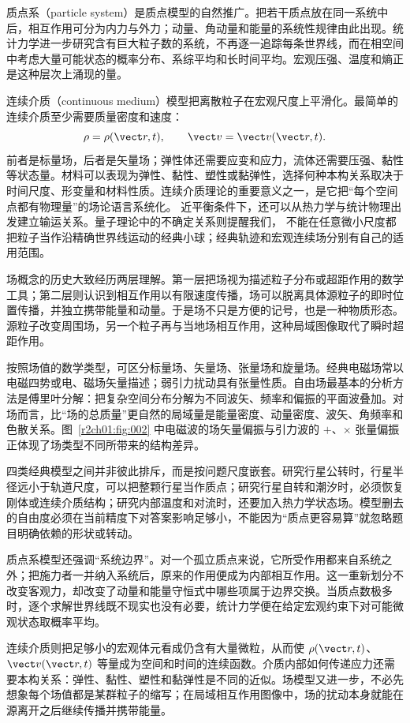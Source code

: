 质点系（particle system）是质点模型的自然推广。把若干质点放在同一系统中后，相互作用可分为内力与外力；动量、角动量和能量的系统性规律由此出现。统计力学进一步研究含有巨大粒子数的系统，不再逐一追踪每条世界线，而在相空间中考虑大量可能状态的概率分布、系综平均和长时间平均。宏观压强、温度和熵正是这种层次上涌现的量。

连续介质（continuous medium）模型把离散粒子在宏观尺度上平滑化。最简单的连续介质至少需要质量密度和速度：
\[
  \rho=\rho(\vect r,t),\qquad \vect v=\vect v(\vect r,t).
\]
前者是标量场，后者是矢量场；弹性体还需要应变和应力，流体还需要压强、黏性等状态量。材料可以表现为弹性、黏性、塑性或黏弹性，选择何种本构关系取决于时间尺度、形变量和材料性质。连续介质理论的重要意义之一，是它把“每个空间点都有物理量”的场论语言系统化。
近平衡条件下，还可以从热力学与统计物理出发建立输运关系。量子理论中的不确定关系则提醒我们，
不能在任意微小尺度都把粒子当作沿精确世界线运动的经典小球；经典轨迹和宏观连续场分别有自己的适用范围。

场概念的历史大致经历两层理解。第一层把场视为描述粒子分布或超距作用的数学工具；第二层则认识到相互作用以有限速度传播，场可以脱离具体源粒子的即时位置传播，并独立携带能量和动量。于是场不只是方便的记号，也是一种物质形态。源粒子改变周围场，另一个粒子再与当地场相互作用，这种局域图像取代了瞬时超距作用。

按照场值的数学类型，可区分标量场、矢量场、张量场和旋量场。经典电磁场常以电磁四势或电、磁场矢量描述；弱引力扰动具有张量性质。自由场最基本的分析方法是傅里叶分解：把复杂空间分布分解为不同波矢、频率和偏振的平面波叠加。对场而言，比“场的总质量”更自然的局域量是能量密度、动量密度、波矢、角频率和色散关系。图~\ref{r2ch01:fig:002} 中电磁波的场矢量偏振与引力波的 $+$、$\times$ 张量偏振正体现了场类型不同所带来的结构差异。

四类经典模型之间并非彼此排斥，而是按问题尺度嵌套。研究行星公转时，行星半径远小于轨道尺度，可以把整颗行星当作质点；研究行星自转和潮汐时，必须恢复刚体或连续介质结构；研究内部温度和对流时，还要加入热力学状态场。模型删去的自由度必须在当前精度下对答案影响足够小，不能因为“质点更容易算”就忽略题目明确依赖的形状或转动。

质点系模型还强调“系统边界”。对一个孤立质点来说，它所受作用都来自系统之外；把施力者一并纳入系统后，原来的作用便成为内部相互作用。这一重新划分不改变客观力，却改变了动量和能量守恒式中哪些项属于边界交换。当质点数极多时，逐个求解世界线既不现实也没有必要，统计力学便在给定宏观约束下对可能微观状态取概率平均。

连续介质则把足够小的宏观体元看成仍含有大量微粒，从而使 $\rho(\vect r,t)$、$\vect v(\vect r,t)$ 等量成为空间和时间的连续函数。介质内部如何传递应力还需要本构关系：弹性、黏性、塑性和黏弹性是不同的近似。场模型又进一步，不必先想象每个场值都是某群粒子的缩写；在局域相互作用图像中，场的扰动本身就能在源离开之后继续传播并携带能量。

